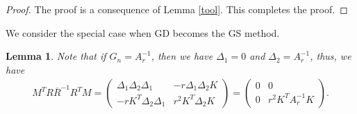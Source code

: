 \documentclass{article}
\newtheorem{lemma}{Lemma}
\theoremstyle{definition}
\begin{document}
\begin{proof}
The proof is a consequence of Lemma \ref{tool}. This completes the proof. 
\end{proof}
We consider the special case when GD becomes the GS method. 
\begin{lemma} 
Note that if $G_n = A_r^{-1}$, then we have $\Delta_1 = 0$ and $\Delta_2 = A_r^{-1}$, thus, we have 
\begin{eqnarray*}
M^T R \overline{R}^{-1} R^TM = \begin{pmatrix} \Delta_1 \Delta_2 \Delta_1 & -r \Delta_1 \Delta_2 K  \\ -r K^T \Delta_2 \Delta_1 & r^2 K^T \Delta_2 K \end{pmatrix} = \begin{pmatrix} 0 & 0  \\ 0 & r^2 K^T A_r^{-1} K \end{pmatrix}.
\end{eqnarray*} 
\end{lemma}
\begin{comment}
We note that with $Y = A_r^{1/2}X$ and $Z = (I - rA_r^{-1})^{1/2}Kz$, we see that
\begin{subeqnarray*}
\langle Y, Y \rangle &=& \langle A_r X, X\rangle \\ 
\langle r^{1/2} Z, r^{1/2} Z \rangle &=& \langle C z, z \rangle. 
\end{subeqnarray*}
Furthermore, we have that 
\begin{eqnarray*}
\langle \Delta_2 \Delta_1 X, \Delta_1 X \rangle &=& \langle A_r^{-1/2} \Delta_1 \Delta_2 \Delta_1 A_r^{-1/2} Y, Y\rangle \\
r^2 \langle \Delta_2 Kz, Kz)\rangle &=& r \langle (I - rA_r^{-1})^{-1/2} \Delta_2 (I - rA_r^{-1})^{-1/2} r^{1/2} Z, r^{1/2} Z)\rangle 
\end{eqnarray*} 
Therefore, we only need to estimate the spectral radius of the following two operators: 
\begin{subeqnarray*}
A_r^{-1/2} \Delta_1 \Delta_2 \Delta_1 A_r^{-1/2} &=& A_r^{-1/2} (A_r - G_n^{-1}) (2 G_n^{-1} - A_r)^{-1}(A_r - G_n^{-1}) A_r^{-1/2} \\
r (I - rA_r^{-1})^{-1/2} \Delta_2 (I - rA_r^{-1})^{-1/2} &=& r (I - rA_r^{-1})^{-1/2} (2 G_n^{-1} - A_r)^{-1} (I - rA_r^{-1})^{-1/2} 
\end{subeqnarray*}
\end{comment}
\end{document}
